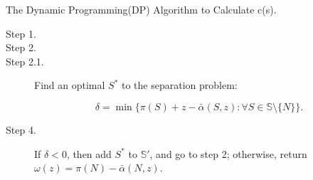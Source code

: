 \documentclass[UTF8]{article}
\begin{document}
\begin{algorithm}[h]\label{algoDP}
\caption{The Dynamic Programming(DP) Algorithm to Calculate c(s).}
\begin{algorithmic}[1]

\begin{description}
  \item[Step 1.]
  \item[Step 2.]

  \qquad \item[Step 2.1.] Find an optimal $S^*$ to the separation problem:

  \begin{equation*}
  \delta = \min \big\{ \pi(S)+z-\bar{\alpha}(S,z): \forall S \in \mathbb{S} \setminus \{N\}\big\}.
  \end{equation*}

  \item[Step 4.]
  If $\delta<0$, then add $S^*$ to $\mathbb{S}'$, and go to step 2; otherwise, return $\omega(z)=\pi(N)-\bar{\alpha}(N,z)$.

\end{description}

\end{algorithmic}
\end{algorithm}
\end{document}
